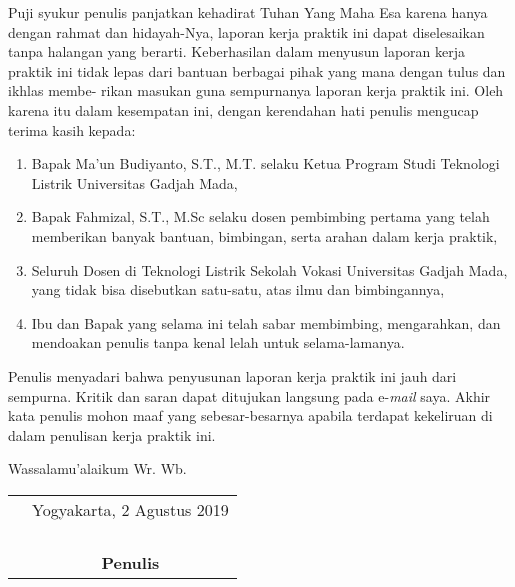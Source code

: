 \documentclass{DTEDI_KP}
\begin{document}
	
	\cover
	
	\approvalpage
	
	\preface
	
Puji syukur penulis panjatkan kehadirat Tuhan Yang Maha Esa karena hanya dengan rahmat dan hidayah-Nya, laporan kerja praktik ini dapat diselesaikan tanpa halangan yang berarti. Keberhasilan dalam menyusun laporan kerja praktik ini tidak lepas dari bantuan berbagai pihak yang mana dengan tulus dan ikhlas membe- rikan masukan guna sempurnanya laporan kerja praktik ini.  Oleh karena itu dalam kesempatan ini, dengan kerendahan hati penulis mengucap terima kasih kepada:
	
	\begin{enumerate}
		\item Bapak Ma’un Budiyanto, S.T., M.T. selaku Ketua Program Studi Teknologi Listrik Universitas Gadjah Mada,
		\item  Bapak Fahmizal, S.T., M.Sc selaku dosen pembimbing pertama yang telah memberikan banyak bantuan, bimbingan, serta arahan dalam kerja praktik,
		\item Seluruh Dosen di Teknologi Listrik Sekolah Vokasi Universitas Gadjah Mada, yang tidak bisa disebutkan satu-satu, atas ilmu dan bimbingannya,
		\item Ibu dan Bapak yang selama ini telah sabar membimbing, mengarahkan, dan mendoakan penulis tanpa kenal lelah untuk selama-lamanya.
	\end{enumerate}

Penulis menyadari bahwa penyusunan laporan kerja praktik ini jauh dari sempurna. Kritik dan saran dapat ditujukan langsung pada e-\textit{mail} saya. Akhir kata penulis mohon maaf yang sebesar-besarnya apabila terdapat kekeliruan di dalam penulisan kerja praktik ini.

\vspace{0.1cm}

Wassalamu’alaikum Wr. Wb.

	\begin{tabular}{p{7.5cm}c}
	&Yogyakarta, 2 Agustus 2019\\
	&\\
	&\\
	&\\
	&\\
	&\textbf{Penulis}
	\end{tabular}

\tableofcontents
{}
\listoftables
{}
\listoffigures
{}
\end{document}
